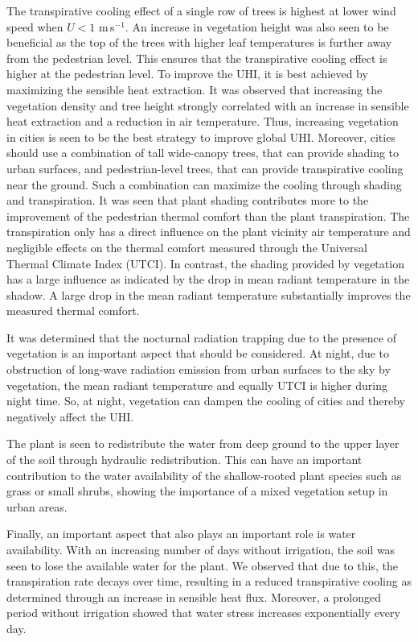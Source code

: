 The transpirative cooling effect of a single row of trees is highest at lower wind speed when $U<1$ m\,s$^{-1}$. An increase in vegetation height was also seen to be beneficial as the top of the trees with higher leaf temperatures is further away from the pedestrian level. This ensures that the transpirative cooling effect is higher at the pedestrian level. To improve the UHI, it is best achieved by maximizing the sensible heat extraction. It was observed that increasing the vegetation density and tree height strongly correlated with an increase in sensible heat extraction and a reduction in air temperature. Thus, increasing vegetation in cities is seen to be the best strategy to improve global UHI. Moreover, cities should use a combination of tall wide-canopy trees, that can provide shading to urban surfaces, and pedestrian-level trees, that can provide transpirative cooling near the ground. Such a combination can maximize the cooling through shading and transpiration. It was seen that plant shading contributes more to the improvement of the pedestrian thermal comfort than the plant transpiration. The transpiration only has a direct influence on the plant vicinity air temperature and negligible effects on the thermal comfort measured through the Universal Thermal Climate Index (UTCI). In contrast, the shading provided by vegetation has a large influence as indicated by the drop in mean radiant temperature in the shadow. A large drop in the mean radiant temperature substantially improves the measured thermal comfort. 

It was determined that the nocturnal radiation trapping due to the presence of vegetation is an important aspect that should be considered. At night, due to obstruction of long-wave radiation emission from urban surfaces to the sky by vegetation, the mean radiant temperature and equally UTCI is higher during night time. So, at night, vegetation can dampen the cooling of cities and thereby negatively affect the UHI.

The plant is seen to redistribute the water from deep ground to the upper layer of the soil through hydraulic redistribution. This can have an important contribution to the water availability of the shallow-rooted plant species such as grass or small shrubs, showing the importance of a mixed vegetation setup in urban areas. 

Finally, an important aspect that also plays an important role is water availability. With an increasing number of days without irrigation, the soil was seen to lose the available water for the plant. We observed that due to this, the transpiration rate decays over time, resulting in a reduced transpirative cooling as determined through an increase in sensible heat flux. Moreover, a prolonged period without irrigation showed that water stress increases exponentially every day.  


